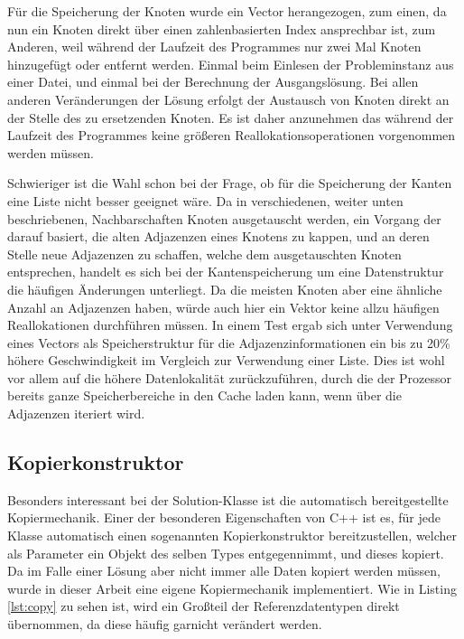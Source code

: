 Für die Speicherung der Knoten wurde ein Vector herangezogen, zum einen, da nun ein Knoten direkt über einen zahlenbasierten Index ansprechbar ist, zum Anderen, weil während der Laufzeit des Programmes nur
zwei Mal Knoten hinzugefügt oder entfernt werden. Einmal beim Einlesen der Probleminstanz aus einer Datei, und einmal bei der Berechnung der Ausgangslösung. Bei allen anderen Veränderungen der Lösung erfolgt
der Austausch von Knoten direkt an der Stelle des zu ersetzenden Knoten. Es ist daher anzunehmen das während der Laufzeit des Programmes keine größeren Reallokationsoperationen vorgenommen werden müssen.

Schwieriger ist die Wahl schon bei der Frage, ob für die Speicherung der Kanten eine Liste nicht besser geeignet wäre. Da in verschiedenen, weiter unten beschriebenen, Nachbarschaften Knoten ausgetauscht werden,
ein Vorgang der darauf basiert, die alten Adjazenzen eines Knotens zu kappen, und an deren Stelle neue Adjazenzen zu schaffen, welche dem ausgetauschten Knoten entsprechen, handelt es sich bei der Kantenspeicherung
um eine Datenstruktur die häufigen Änderungen unterliegt. Da die meisten Knoten aber eine ähnliche Anzahl an Adjazenzen haben, würde auch hier ein Vektor keine allzu häufigen Reallokationen durchführen müssen.
In einem Test ergab sich unter Verwendung eines Vectors als Speicherstruktur für die Adjazenzinformationen ein bis zu 20\% höhere Geschwindigkeit im Vergleich zur Verwendung einer Liste. Dies ist wohl vor allem
auf die höhere Datenlokalität zurückzuführen, durch die der Prozessor bereits ganze Speicherbereiche in den Cache laden kann, wenn über die Adjazenzen iteriert wird.

\subsection{Kopierkonstruktor}
\label{sec:copy}

Besonders interessant bei der Solution-Klasse ist die automatisch bereitgestellte Kopiermechanik. Einer der besonderen Eigenschaften von C++ ist es, für jede Klasse automatisch einen sogenannten Kopierkonstruktor
bereitzustellen, welcher als Parameter ein Objekt des selben Types entgegennimmt, und dieses kopiert. Da im Falle einer Lösung aber nicht immer alle Daten kopiert werden müssen, wurde in dieser Arbeit eine
eigene Kopiermechanik implementiert. Wie in Listing \ref{lst:copy} zu sehen ist, wird ein Großteil der Referenzdatentypen direkt übernommen, da diese häufig garnicht verändert werden. 

